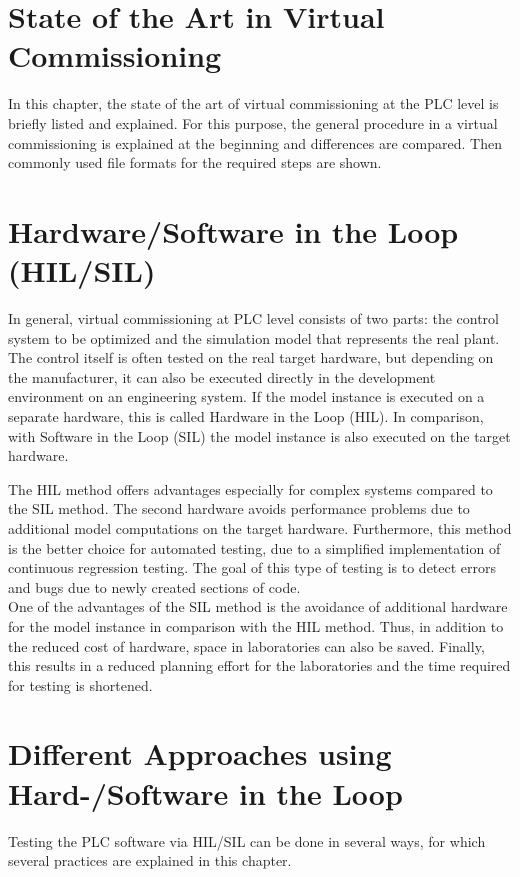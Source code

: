 \section{State of the Art in Virtual Commissioning}	\label{sec:StateOfTheArt}
	In this chapter, the state of the art of virtual commissioning at the PLC level is briefly listed and explained. For this purpose, the general procedure in a virtual commissioning is explained at the beginning and differences are compared. Then commonly used file formats for the required steps are shown.

\section{Hardware/Software in the Loop (HIL/SIL)}
	In general, virtual commissioning at PLC level consists of two parts: the control system to be optimized and the simulation model that represents the real plant. The control itself is often tested on the real target hardware, but depending on the manufacturer, it can also be executed directly in the development environment on an engineering system. If the model instance is executed on a separate hardware, this is called Hardware in the Loop (HIL). In comparison, with Software in the Loop (SIL) the model instance is also executed on the target hardware.
		
	The HIL method offers advantages especially for complex systems compared to the SIL method. The second hardware avoids performance problems due to additional model computations on the target hardware. Furthermore, this method is the better choice for automated testing, due to a simplified implementation of continuous regression testing. The goal of this type of testing is to detect errors and bugs due to newly created sections of code. \\
	One of the advantages of the SIL method is the avoidance of additional hardware for the model instance in comparison with the HIL method. Thus, in addition to the reduced cost of hardware, space in laboratories can also be saved. Finally, this results in a reduced planning effort for the laboratories and the time required for testing is shortened. 

\section{Different Approaches using Hard-/Software in the Loop}
	Testing the PLC software via HIL/SIL can be done in several ways, for which several practices are explained in this chapter. 

